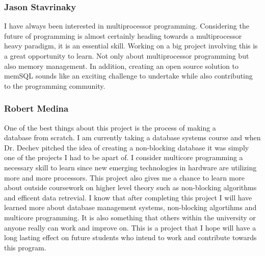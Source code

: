 \documentclass[letterpaper, 11pt]{article}
\begin{document}
\subsubsection{Jason Stavrinaky}
I have always been interested in multiprocessor programming.  Considering the
future  of  programming  is  almost  certainly  heading  towards  a  multiprocessor
heavy paradigm, it is an essential skill.  Working on a big project involving this
is a great opportunity to learn.  Not only about multiprocessor programming
but also memory management.  In addition, creating an open source solution to
memSQL sounds like an exciting challenge to undertake while also contributing
to the programming community.

\subsubsection{Robert Medina}
One of the best things about this project is the process of making a \\ database from scratch.
I am currently taking a database systems course and when Dr. Dechev pitched the idea of
creating a non-blocking database it was simply one of the projects I had to be apart of.
I consider multicore programming a necessary skill to learn since new emerging technologies
in hardware are utilizing more and more processors. This project also gives me a chance to
learn more about outside coursework on higher level theory such as non-blocking algorithms
and efficent data retrevial. I know that after completing this project I will have learned
more about database management systems, non-blocking algortihms and multicore programming.
It is also something that others within the university or anyone really can work and improve
on. This is a project that I hope will have a long lasting effect on future students who
intend to work and contribute towards this program.

\newpage
\end{document}
